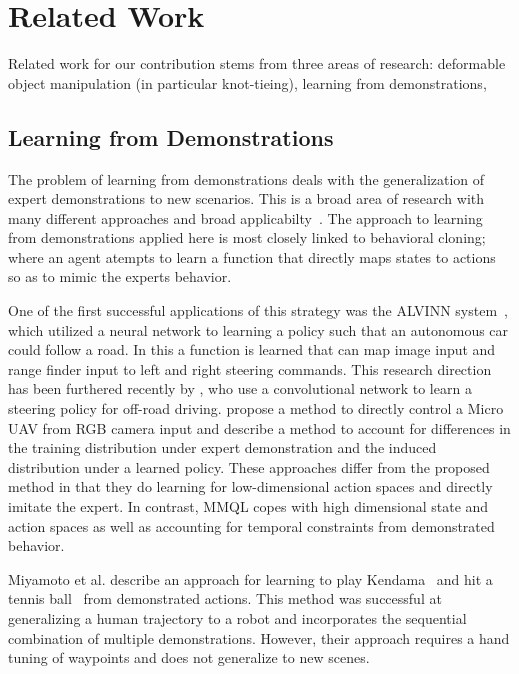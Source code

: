 \section{Related Work}
Related work for our contribution stems from three areas of research: deformable object manipulation (in particular knot-tieing), learning from demonstrations, 

\subsection{Learning from Demonstrations}
The problem of learning from demonstrations deals with the generalization of expert demonstrations to new scenarios. 
This is a broad area of research with many different approaches and broad applicabilty~\cite{Argall_2009, Schaal_1999}.
The approach to learning from demonstrations applied here is most closely linked to behavioral cloning; where an agent atempts to learn a function that directly maps states to actions so as to mimic the experts behavior. 

One of the first successful applications of this strategy was the ALVINN system~\cite{Pomerleau_NIPS1989}, which utilized a neural network to learning a policy such that an autonomous car could follow a road.
In this a function is learned that can map image input and range finder input to left and right steering commands. 
This research direction has been furthered recently by \citet{muller2005off}, who use a convolutional network to learn a steering policy for off-road driving.
\citet{Ross_2013} propose a method to directly control a Micro UAV from RGB camera input and describe a method to account for differences in the training distribution under expert demonstration and the induced distribution under a learned policy. 
These approaches differ from the proposed method in that they do learning for low-dimensional action spaces and directly imitate the expert.
In contrast, MMQL copes with high dimensional state and action spaces as well as accounting for temporal constraints from demonstrated behavior.

Miyamoto et al. describe an approach for learning to play Kendama~\cite{Miyamoto_1996} and hit a tennis ball~\cite{Miyamoto_1998} from demonstrated actions. 
This method was successful at generalizing a human trajectory to a robot and incorporates the sequential combination of multiple demonstrations.
However, their approach requires a hand tuning of waypoints and does not generalize to new scenes.


